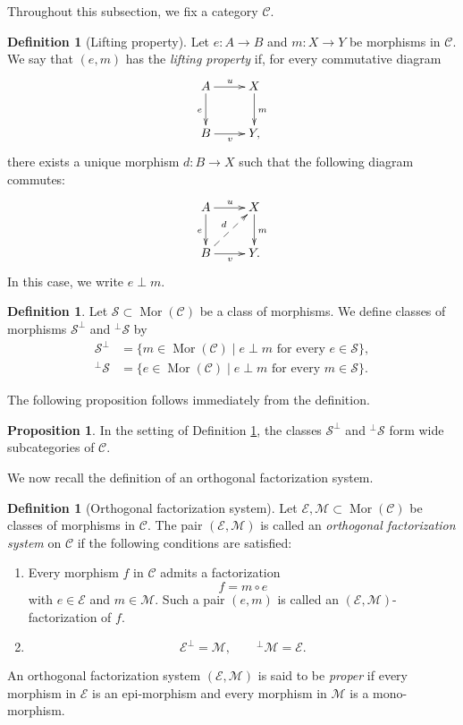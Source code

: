 \documentclass[12pt, a4paper]{amsart}
\theoremstyle{definition}
\newtheorem{proposition}[theorem]{Proposition}
\newtheorem{definition}[theorem]{Definition}
\newcommand{\Mor}{\mathop{\mathrm{Mor}}\nolimits}
\begin{document}
Throughout this subsection, we fix a category $\mathcal{C}$.

\begin{definition}[Lifting property]
Let $e:A\to B$ and $m:X\to Y$ be morphisms in $\mathcal{C}$.
We say that $(e,m)$ has the \emph{lifting property} if, for every commutative diagram
\[
\xymatrix{
A \ar[r]^{u} \ar[d]_{e} & X \ar[d]^{m} \\
B \ar[r]_{v} & Y,
}
\]
there exists a unique morphism $d:B\to X$ such that the following diagram commutes:
\[
\xymatrix{
A \ar[r]^{u} \ar[d]_{e} & X \ar[d]^{m} \\
B \ar[r]_{v} \ar@{-->}[ur]^{d} & Y.
}
\]
In this case, we write $e\perp m$.
\end{definition}

\begin{definition}\label{definition:perpmor}
Let $\mathcal{S}\subset\Mor(\mathcal{C})$ be a class of morphisms.
We define classes of morphisms $\mathcal{S}^{\perp}$ and ${}^{\perp}\mathcal{S}$ by
\[
\begin{aligned}
\mathcal{S}^{\perp}
&=
\{
m\in\Mor(\mathcal{C})
\mid
e\perp m
\text{ for every }
e\in\mathcal{S}
\},
\\
{}^{\perp}\mathcal{S}
&=
\{
e\in\Mor(\mathcal{C})
\mid
e\perp m
\text{ for every }
m\in\mathcal{S}
\}.
\end{aligned}
\]
\end{definition}

The following proposition follows immediately from the definition.

\begin{proposition}\label{proposition:perpsubcategory}
In the setting of Definition \ref{definition:perpmor},
the classes $\mathcal{S}^{\perp}$ and ${}^{\perp}\mathcal{S}$ form wide
subcategories of $\mathcal{C}$.
\end{proposition}

We now recall the definition of an orthogonal factorization system.

\begin{definition}[Orthogonal factorization system]\label{definition:OFS}
Let $\mathcal{E},\mathcal{M}\subset\Mor(\mathcal{C})$ be classes of
morphisms in $\mathcal{C}$.
The pair $(\mathcal{E},\mathcal{M})$ is called an
\emph{orthogonal factorization system} on $\mathcal{C}$ if the following
conditions are satisfied:
\begin{enumerate}
\item
Every morphism $f$ in $\mathcal{C}$ admits a factorization
\[
f=m\circ e
\]
with $e\in\mathcal{E}$ and $m\in\mathcal{M}$.
Such a pair $(e,m)$ is called an
$(\mathcal{E},\mathcal{M})$-factorization of $f$.

\item
\[
\mathcal{E}^{\perp}=\mathcal{M},
\qquad
{}^{\perp}\mathcal{M}=\mathcal{E}.
\]
\end{enumerate}

An orthogonal factorization system $(\mathcal{E},\mathcal{M})$ is said to
be \emph{proper} if every morphism in $\mathcal{E}$ is an epi-morphism and
every morphism in $\mathcal{M}$ is a mono-morphism.
\end{definition}
\end{document}
